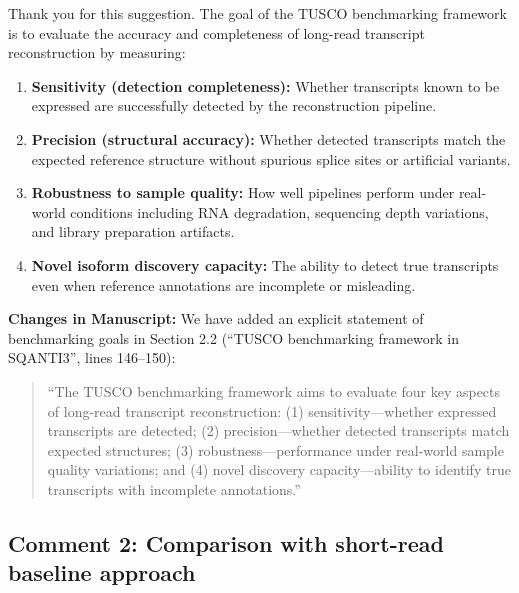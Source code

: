\documentclass[11pt]{article}
\begin{document}
\begin{responseboxnew}
    Thank you for this suggestion. The goal of the TUSCO benchmarking framework is to evaluate the accuracy and completeness
    of long-read transcript reconstruction by measuring:

    \begin{enumerate}
      \item \textbf{Sensitivity (detection completeness):} Whether transcripts
        known to be expressed are successfully detected by the reconstruction
        pipeline.

      \item \textbf{Precision (structural accuracy):} Whether detected
        transcripts match the expected reference structure without spurious
        splice sites or artificial variants.

      \item \textbf{Robustness to sample quality:} How well pipelines perform
        under real-world conditions including RNA degradation, sequencing depth variations,
        and library preparation artifacts.

      \item \textbf{Novel isoform discovery capacity:} The ability to detect
        true transcripts even when reference annotations are incomplete or
        misleading.
    \end{enumerate}

    \vspace{0.3cm}
    \textbf{Changes in Manuscript:} We have added an explicit statement of benchmarking
    goals in Section 2.2 (``TUSCO benchmarking framework in SQANTI3'', lines 146--150):
    \begin{quote}
      ``The TUSCO benchmarking framework aims to evaluate four key aspects of long-read transcript
      reconstruction: (1) sensitivity---whether expressed transcripts are
      detected; (2) precision---whether detected transcripts match expected structures;
      (3) robustness---performance under real-world sample quality variations; and
      (4) novel discovery capacity---ability to identify true transcripts with incomplete
      annotations.''
    \end{quote}
\end{responseboxnew}

\subsection{Comment 2: Comparison with short-read baseline approach}
\end{document}
